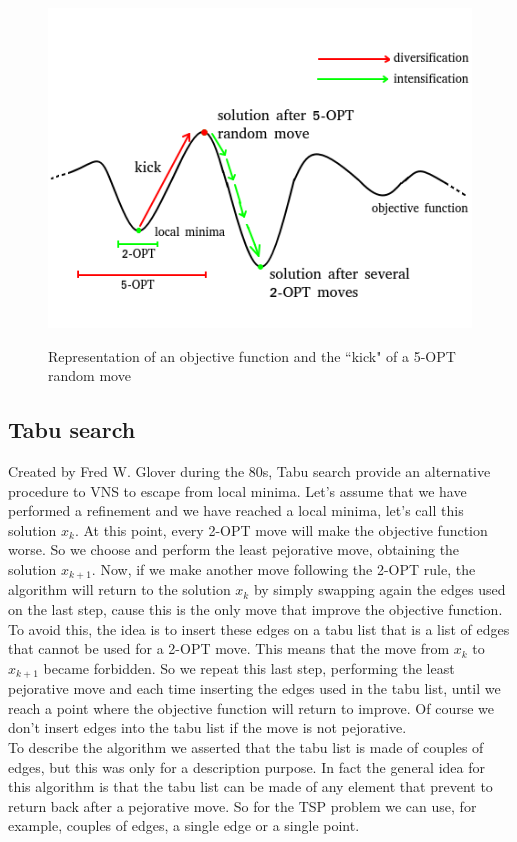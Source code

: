 \begin{figure}[h!]
\centering
	\includegraphics[scale=0.8]{media/VNS.png} \\
	\caption{Representation of an objective function and the ``kick" of a 5-OPT random move}
\end{figure}


\subsection{Tabu search}
Created by Fred W. Glover during the 80s, Tabu search provide an alternative procedure to VNS to escape from local minima. Let's assume that we have performed a refinement and we have reached a local minima, let's call this solution $x_k$. At this point, every 2-OPT move will make the objective function worse. So we choose and perform the least pejorative move, obtaining the solution $x_{k+1}$. Now, if we make another move following the 2-OPT rule, the algorithm will return to the solution $x_{k}$ by simply swapping again the edges used on the last step, cause this is the only move that improve the objective function. To avoid this, the idea is to insert these edges on a tabu list that is a list of edges that cannot be used for a 2-OPT move. This means that the move from $x_{k}$ to $x_{k+1}$ became forbidden. So we repeat this last step, performing the least pejorative move and each time inserting the edges used in the tabu list, until we reach a point where the objective function will return to improve. Of course we don't insert edges into the tabu list if the move is not pejorative. \\
To describe the algorithm we asserted that the tabu list is made of couples of edges, but this was only for a description purpose. In fact the general idea for this algorithm is that the tabu list can be made of any element that prevent to return back after a pejorative move. So for the TSP problem we can use, for example, couples of edges, a single edge or a single point. \\

